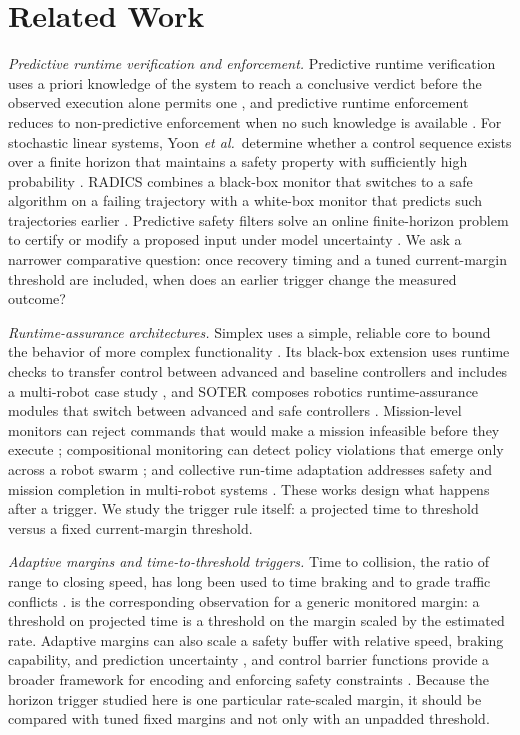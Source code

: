 \section{Related Work}
\label{sec:related}

\emph{Predictive runtime verification and enforcement.}  Predictive runtime
verification uses a priori knowledge of the system to reach a conclusive verdict
before the observed execution alone permits one \cite{pinisetty2017prv}, and
predictive runtime enforcement reduces to non-predictive enforcement when no
such knowledge is available \cite{pinisetty2017pre}.  For stochastic linear
systems, Yoon \emph{et al.}\ determine whether a control sequence exists over a
finite horizon that maintains a safety property with sufficiently high
probability \cite{yoon2019prm}.  RADICS combines a black-box monitor that
switches to a safe algorithm on a failing trajectory with a white-box monitor
that predicts such trajectories earlier \cite{wheatman2021radics}.  Predictive
safety filters solve an online finite-horizon problem to certify or modify a
proposed input under model uncertainty \cite{wabersich2021filter}.  We ask a
narrower comparative question: once recovery timing and a tuned current-margin
threshold are included, when does an earlier trigger change the measured
outcome?

\emph{Runtime-assurance architectures.}  Simplex uses a simple, reliable core to
bound the behavior of more complex functionality \cite{sha2001simplex}.  Its
black-box extension uses runtime checks to transfer control between advanced and
baseline controllers and includes a multi-robot case study
\cite{mehmood2022blackbox}, and SOTER composes robotics runtime-assurance modules
that switch between advanced and safe controllers \cite{desai2019soter}.
Mission-level monitors can reject commands that would make a mission infeasible
before they execute \cite{tsai2026missionrta}; compositional monitoring can
detect policy violations that emerge only across a robot swarm
\cite{kekatos2026swarmrta}; and collective run-time adaptation addresses safety
and mission completion in multi-robot systems \cite{bozhinoski2019collective}.
These works design what happens after a trigger.  We study the trigger rule
itself: a projected time to threshold versus a fixed current-margin threshold.

\emph{Adaptive margins and time-to-threshold triggers.}  Time to collision, the
ratio of range to closing speed, has long been used to time braking and to grade
traffic conflicts \cite{lee1976ttc,mahmud2017surrogate}.
 is the corresponding observation for a generic monitored
margin: a threshold on projected time is a threshold on the margin scaled by the
estimated rate.  Adaptive margins can also scale a safety buffer with relative
speed, braking capability, and prediction uncertainty \cite{xu2026raam}, and
control barrier functions provide a broader framework for encoding and enforcing
safety constraints \cite{ames2019cbf}.  Because the horizon trigger studied here
is one particular rate-scaled margin, it should be compared with tuned fixed
margins and not only with an unpadded threshold.


